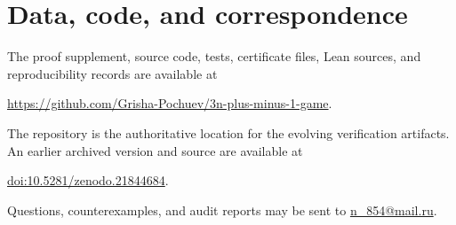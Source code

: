 \documentclass[11pt]{article}
\begin{document}
\section*{Data, code, and correspondence}

The proof supplement, source code, tests, certificate files, Lean sources, and
reproducibility records are available at
\begin{center}
\url{https://github.com/Grisha-Pochuev/3n-plus-minus-1-game}.
\end{center}
The repository is the authoritative location for the evolving verification
artifacts. An earlier archived version and source are available at
\begin{center}
\href{https://doi.org/10.5281/zenodo.21844684}%
{doi:10.5281/zenodo.21844684}.
\end{center}
Questions, counterexamples, and audit reports may be sent to
\href{mailto:n_854@mail.ru}{n\_854@mail.ru}.



\end{document}
